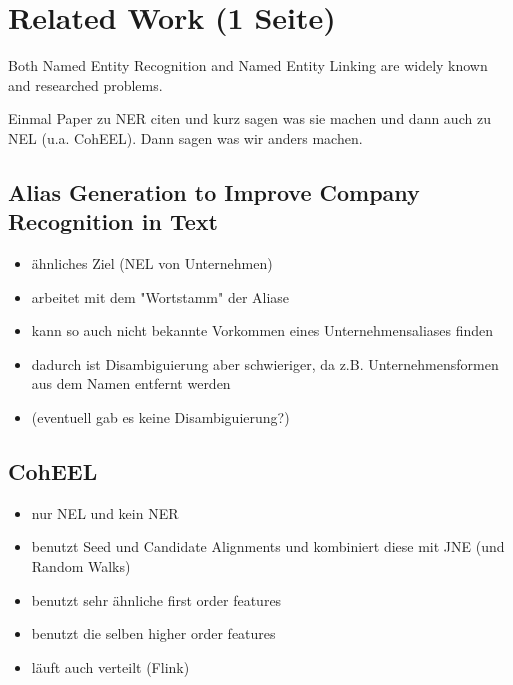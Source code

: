 \section{Related Work (1 Seite)}
\label{sec:RelatedWork}
Both Named Entity Recognition and Named Entity Linking are widely known and researched problems.

Einmal Paper zu NER citen und kurz sagen was sie machen und dann auch zu NEL (u.a. CohEEL). Dann sagen was wir anders machen.

\cite{ner-sekine2007}

	\subsection*{Alias Generation to Improve Company Recognition in Text}
	\begin{itemize}
		\item ähnliches Ziel (NEL von Unternehmen)
		\item arbeitet mit dem "Wortstamm" der Aliase
		\item kann so auch nicht bekannte Vorkommen eines Unternehmensaliases finden
		\item dadurch ist Disambiguierung aber schwieriger, da z.B. Unternehmensformen aus dem Namen entfernt werden
		\item (eventuell gab es keine Disambiguierung?)
	\end{itemize}

	\subsection*{CohEEL}
	\begin{itemize}
		\item nur NEL und kein NER
		\item benutzt Seed und Candidate Alignments und kombiniert diese mit JNE (und Random Walks)
		\item benutzt sehr ähnliche first order features
		\item benutzt die selben higher order features
		\item läuft auch verteilt (Flink)
	\end{itemize}